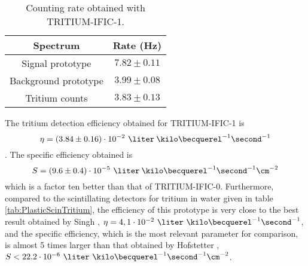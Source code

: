 \begin{table}[htbp]
\centering{}%
\begin{tabular}{cc}
\toprule 
Spectrum & Rate (Hz) \tabularnewline
\midrule
\midrule 
Signal prototype & $7.82 \pm 0.11$ \tabularnewline
Background prototype & $3.99 \pm 0.08$ \tabularnewline  
Tritium counts & $3.83 \pm 0.13$ \tabularnewline
\bottomrule
\end{tabular}
\caption{Counting rate obtained with TRITIUM-IFIC-1.}
\label{tab:CountsPerSecondTRITIUMIFIC1}
\end{table}
The tritium detection efficiency obtained for TRITIUM-IFIC-1 is 
$$\eta=(3.84 \pm 0.16)\cdot{} 10^{-2}~\liter\:\kilo\becquerel^{-1}\second^{-1}$$. The specific efficiency obtained is
$$S=(9.6 \pm 0.4)\cdot{} 10^{-5}~\liter\:\kilo\becquerel^{-1}\second^{-1}\cm^{-2}$$
which is a factor ten better than that of TRITIUM-IFIC-0. Furthermore, compared to the scintillating detectors for tritium in water given in table \ref{tab:PlasticScinTritium}, the efficiency of this prototype is very close to the best result obtained by Singh \cite{Ratnakaran, Ratnakaran2000}, $\eta=4,1 \cdot{} 10^{-2}~\liter\ \kilo\becquerel^{-1}\second^{-1}$, and the specific efficiency, which is the most relevant parameter for comparison, is almost 5 times larger than that obtained by Hofstetter \cite{Hofstetter1, Hofstetter2}, $S<22.2 \cdot{} 10^{-6}~\liter\ \kilo\becquerel^{-1}\second^{-1}\cm^{-2}$.
